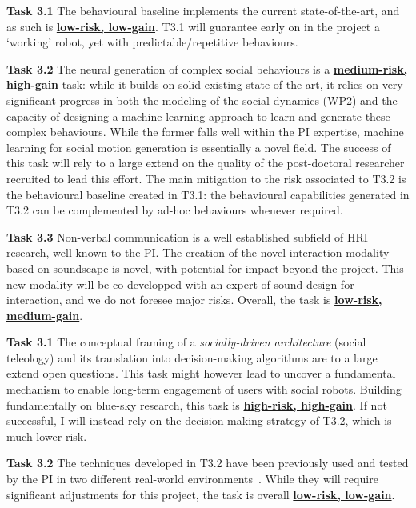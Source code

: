 \vspace{1em}

\textbf{Task 3.1} The behavioural baseline implements the current state-of-the-art,
and as such is \ul{\bf low-risk, low-gain}. T3.1 will guarantee early on in the
project a `working' robot, yet with predictable/repetitive behaviours.

\textbf{Task 3.2} The neural generation of complex social behaviours is a
\ul{\bf medium-risk, high-gain} task: while it builds on solid existing
state-of-the-art, it relies on very significant progress in both the modeling of the
social dynamics (WP2) and the capacity of designing a machine learning approach
to learn and generate these complex behaviours. While the former falls well
within the PI expertise, machine learning for social motion generation is
essentially a novel field. The success of this task will rely to a large
extend on the quality of the post-doctoral researcher recruited to lead this
effort. The main mitigation to the risk associated to T3.2 is the behavioural
baseline created in T3.1: the behavioural capabilities generated in T3.2 can be
complemented by ad-hoc behaviours whenever required.

\textbf{Task 3.3} Non-verbal communication is a well established subfield of HRI
research, well known to the PI. The creation of the novel interaction modality
based on soundscape is novel, with potential for impact beyond the project. This
new modality will be co-developped with an expert of sound design for
interaction, and we do not foresee major risks. Overall, the task is \ul{\bf
low-risk, medium-gain}.

\vspace{1em}

\textbf{Task 3.1} The conceptual framing of a \emph{socially-driven
architecture} (social teleology) and its translation into decision-making
algorithms are to a large extend open questions. This task might however lead to
uncover a fundamental mechanism to enable long-term engagement of users
with social robots. Building fundamentally on blue-sky research, this task is
\ul{\bf high-risk, high-gain}. If not successful, I will instead rely on the
decision-making strategy of T3.2, which is much lower risk.

\textbf{Task 3.2} The techniques developed in T3.2 have been previously used and
tested by the PI in two different real-world
environments~\cite{senft2019teaching,winkle2020couch}. While they will require
significant adjustments for this project, the task is overall \ul{\bf low-risk,
low-gain}.

